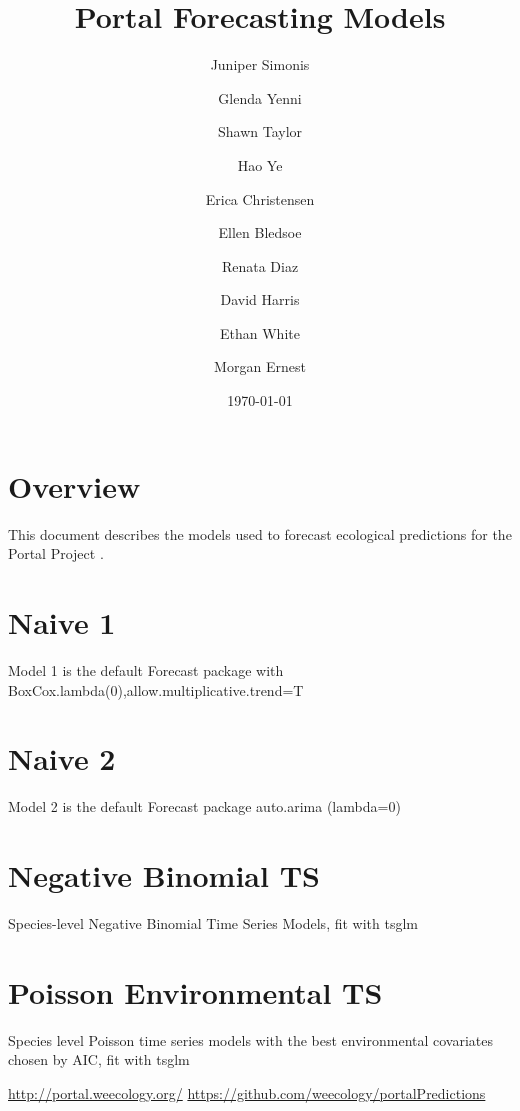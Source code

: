 \documentclass{article}
\title{Portal Forecasting Models}
\author[1]{Juniper Simonis}
\author[1]{Glenda Yenni}
\author[1]{Shawn Taylor}
\author[1]{Hao Ye}
\author[1]{Erica Christensen}
\author[1]{Ellen Bledsoe}
\author[1]{Renata Diaz}
\author[1]{David Harris}
\author[1]{Ethan White}
\author[1]{Morgan Ernest}
\affil[1]{Weecology Laboratory, University of Florida}
\date{\today}
\begin{document}
\maketitle
\tableofcontents

\section*{Overview}
\label{sec:overview}

This document describes the models used to forecast ecological predictions for the Portal Project \cite{portal, portalpredictions}. 

\section{Naive 1}
\label{sec:naive01}

Model 1 is the default Forecast package with BoxCox.lambda(0),allow.multiplicative.trend=T

\section{Naive 2}
\label{sec:naive02}

Model 2 is the default Forecast package auto.arima (lambda=0)

\section{Negative Binomial TS}
\label{sec:neg_binom_ts}

Species-level Negative Binomial Time Series Models, fit with tsglm

\section{Poisson Environmental TS}
\label{sec:pois_env_ts}

Species level Poisson time series models with the best environmental covariates chosen by AIC, fit with tsglm

\begin{thebibliography}{9}
  \url{http://portal.weecology.org/}
  \url{https://github.com/weecology/portalPredictions}

\end{thebibliography}
\end{document}
